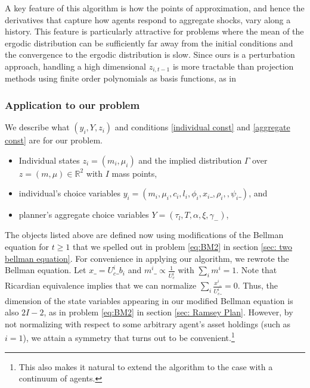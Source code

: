 \documentclass[thmsb,11pt]{article}
\begin{document}
A key feature of this algorithm is how the points of approximation, and hence the derivatives that capture how agents respond to aggregate shocks, vary along a history. This feature is particularly attractive for problems where the mean of the ergodic distribution can be sufficiently far away from the initial conditions and  the convergence to the ergodic distribution is slow. Since ours is a perturbation approach, handling a high dimensional $z_{i,t-1}$ is more tractable than projection methods using finite order polynomials as basis functions, as in \cite{Judd2011}


\subsubsection{Application to our problem}
We  describe what $\left(y_{i},Y,z_{i}\right)$ and conditions \eqref{individual const} and \eqref{aggregate const} are for our problem.

\begin{itemize}
\item Individual states $z_i= (m_i,\mu_i)$ and the implied distribution $\Gamma$ over $z= (m,\mu)\in \mathbb R^2$ with $I$ mass points,
\item individual's choice variables $y_i = (m_i,\mu_i,c_i,l_i,\phi_i,x_{i}\_,\rho_i,,\psi_{i}\_)$, and
\item planner's aggregate choice variables		$Y = (\tau_l,T,\alpha,\xi,\gamma_-)$,
\end{itemize}

The objects listed above are defined now using modifications of the Bellman equation for $t\geq 1$ that we spelled out in problem \eqref{eq:BM2} in section \ref{sec: two bellman equation}. For convenience in applying our algorithm, we rewrote the Bellman equation.
 Let $x\_=U^i_c\_b_{i}$ and $m^i\_\propto \frac{1}{U^i_{c}}$ with $\sum_{i}m^i=1$. Note that Ricardian equivalence implies that we can normalize $\sum_{i}\frac{x^i\_}{U^i_c\_}=0$. Thus, the  dimension of the state variables appearing in our modified  Bellman equation is also $2I-2$, as in problem \eqref{eq:BM2} in section \ref{sec: Ramsey Plan}. However, by not normalizing with respect to some arbitrary agent's asset holdings (such as $i=1$), we attain a symmetry that turns out to be convenient.\footnote{This also makes it natural to extend the algorithm to the case with a continuum of agents.}
\end{document}

